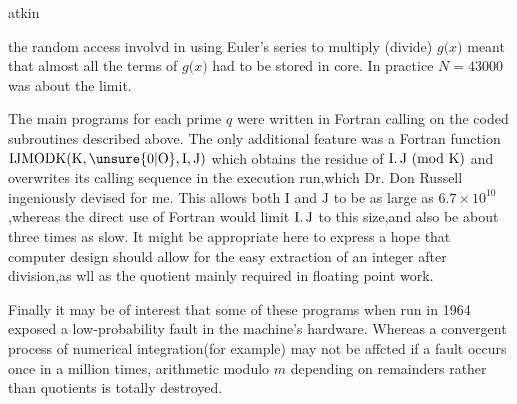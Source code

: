 \begin{flushright}
atkin 
\end{flushright}

\reversemarginpar the random access involv\margin{\handwritten{/}}d in using Euler's series to multiply (divide) \uline{$g(x$}$)$ meant that almost all the terms of \uline{$g(x$}$)$ had to be stored in core. In practice $N=43000$ was about the limit.

The main programs for each prime \uline{$q$} were written in Fortran calling on the coded subroutines described above. The only additional feature was a Fortran function $\mathrm{IJMODK}(\mathrm{K},\unsure{0|\mathrm{O}},\mathrm{I},\mathrm{J})$ which obtains the residue of $\mathrm{I}\ldotp\mathrm{J}\ (\mathrm{mod}\ \mathrm{K})$ and overwrites its calling sequence in the\normalmarginpar{} execution run,which Dr. Don Russell ingeniously devised for me. This allows both $\mathrm{I}$ and $\mathrm{J}$ to be as large as $6.7\times10^{10}$,whereas the direct use of Fortran would limit $\mathrm{I}\ldotp\mathrm{J}$ to this size,and also be about three times as slow. It might be appropriate here to express a hope that computer design should allow for the easy extraction of an integer \uline{} after division,as \reversemarginpar w\margin{\handwritten{/}}ll as the quotient mainly required in floating point work.

Finally it may be of interest that some of these programs when run in 1964 exposed a low-probability  fault in the machine's hardware. Whereas a convergent process of numerical integration(for example) may not be affcted if a fault occurs once in a million times, arithmetic modulo \uline{$m$} depending on remainders rather than quotients is totally destroyed.
\normalmarginpar
